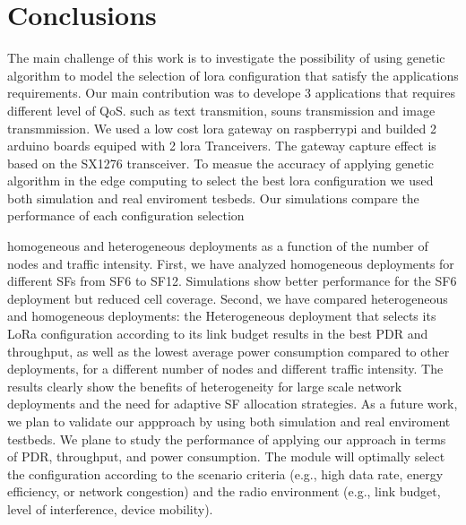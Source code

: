 \section{Conclusions} \label{sec:Conclusions}

The main challenge of this work is to investigate the possibility of using genetic algorithm to model the selection of lora configuration that satisfy the applications requirements.
Our main contribution was to develope 3 applications that requires different level of QoS.
such as text transmition, souns transmission and image transmmission. We used a low cost lora gateway on raspberrypi and builded 2 arduino boards equiped with 2 lora Tranceivers.
The gateway capture effect is based on the SX1276 transceiver.
To measue the accuracy of applying genetic algorithm in the edge computing to select the best lora configuration we used both simulation and real enviroment tesbeds.
Our simulations compare the performance of each configuration selection 


homogeneous and heterogeneous deployments as a function of the number of nodes and traffic intensity.
First,
	we have analyzed homogeneous deployments for different SFs from SF6 to SF12.
Simulations show better performance for the SF6 deployment but reduced cell coverage.
Second,
	we have compared heterogeneous and homogeneous deployments:
	the Heterogeneous deployment that selects its LoRa configuration according to its link budget results in the best PDR and throughput,
	as well as the lowest average power consumption compared to other deployments,
	for a different number of nodes and different traffic intensity.
The results clearly show the benefits of heterogeneity for large scale network deployments and the need for adaptive SF allocation strategies.
As a future work,
	we plan to validate our appproach by using both simulation and real enviroment testbeds. 
We plane to study the performance of applying our approach in terms of PDR,
	throughput,
	and power consumption.
The module will optimally select the configuration according to the scenario criteria (e.g.,
	high data rate,
	energy efficiency,
	or network congestion) and the radio environment (e.g.,
	link budget,
	level of interference,
	device mobility).

